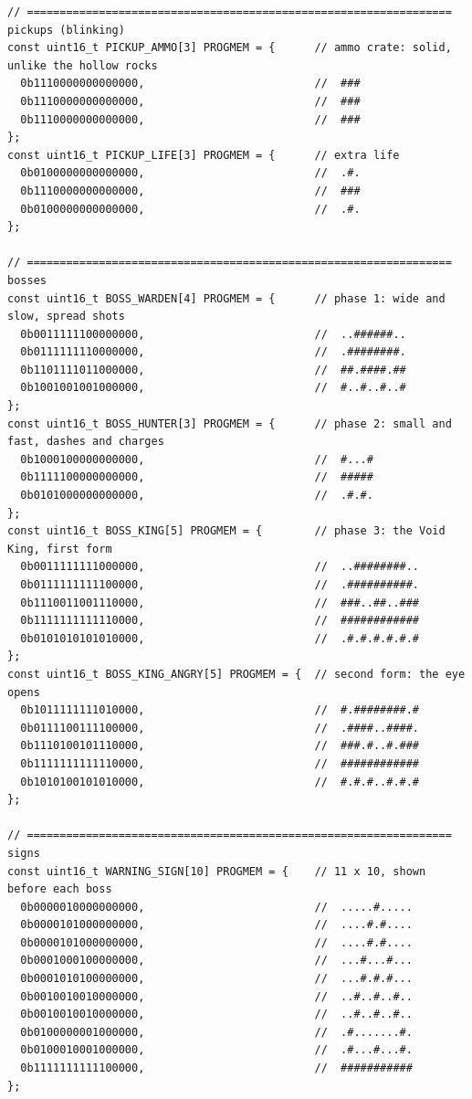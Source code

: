 \documentclass[11pt,a4paper]{article}
\begin{document}
\begin{lstlisting}[language=Arduino]
// ================================================================= pickups (blinking)
const uint16_t PICKUP_AMMO[3] PROGMEM = {      // ammo crate: solid, unlike the hollow rocks
  0b1110000000000000,                          //  ###
  0b1110000000000000,                          //  ###
  0b1110000000000000,                          //  ###
};
const uint16_t PICKUP_LIFE[3] PROGMEM = {      // extra life
  0b0100000000000000,                          //  .#.
  0b1110000000000000,                          //  ###
  0b0100000000000000,                          //  .#.
};

// ================================================================= bosses
const uint16_t BOSS_WARDEN[4] PROGMEM = {      // phase 1: wide and slow, spread shots
  0b0011111100000000,                          //  ..######..
  0b0111111110000000,                          //  .########.
  0b1101111011000000,                          //  ##.####.##
  0b1001001001000000,                          //  #..#..#..#
};
const uint16_t BOSS_HUNTER[3] PROGMEM = {      // phase 2: small and fast, dashes and charges
  0b1000100000000000,                          //  #...#
  0b1111100000000000,                          //  #####
  0b0101000000000000,                          //  .#.#.
};
const uint16_t BOSS_KING[5] PROGMEM = {        // phase 3: the Void King, first form
  0b0011111111000000,                          //  ..########..
  0b0111111111100000,                          //  .##########.
  0b1110011001110000,                          //  ###..##..###
  0b1111111111110000,                          //  ############
  0b0101010101010000,                          //  .#.#.#.#.#.#
};
const uint16_t BOSS_KING_ANGRY[5] PROGMEM = {  // second form: the eye opens
  0b1011111111010000,                          //  #.########.#
  0b0111100111100000,                          //  .####..####.
  0b1110100101110000,                          //  ###.#..#.###
  0b1111111111110000,                          //  ############
  0b1010100101010000,                          //  #.#.#..#.#.#
};

// ================================================================= signs
const uint16_t WARNING_SIGN[10] PROGMEM = {    // 11 x 10, shown before each boss
  0b0000010000000000,                          //  .....#.....
  0b0000101000000000,                          //  ....#.#....
  0b0000101000000000,                          //  ....#.#....
  0b0001000100000000,                          //  ...#...#...
  0b0001010100000000,                          //  ...#.#.#...
  0b0010010010000000,                          //  ..#..#..#..
  0b0010010010000000,                          //  ..#..#..#..
  0b0100000001000000,                          //  .#.......#.
  0b0100010001000000,                          //  .#...#...#.
  0b1111111111100000,                          //  ###########
};


\end{lstlisting}
\end{document}

